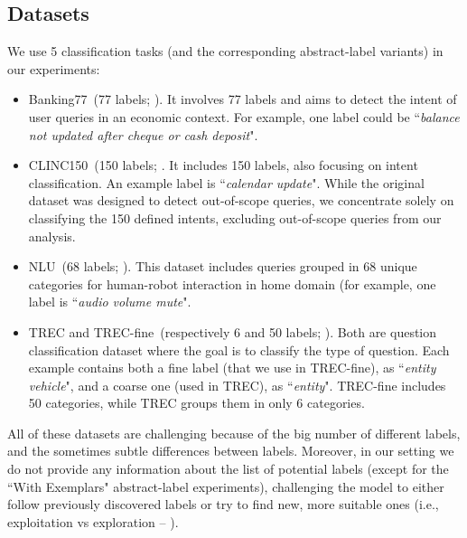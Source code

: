 \documentclass{article}
\theoremstyle{plain}
\theoremstyle{definition}
\theoremstyle{remark}
\newcommand{\banking}{Banking77\xspace}
\newcommand{\clinic}{CLINC150\xspace}
\newcommand{\trec}{TREC\xspace}
\newcommand{\trecfine}{TREC-fine\xspace}
\newcommand{\nlu}{NLU\xspace}
\begin{document}
\subsection{Datasets}\label{sec:appendix:datasets}
We use 5 classification tasks (and the corresponding abstract-label variants) in our experiments:
\begin{itemize}
    \item \banking~(77 labels; \citet{Casanueva2020}). It involves 77 labels and aims to detect the intent of user queries in an economic context. For example, one label could be ``\textit{balance not updated after cheque or cash deposit}".
    \item \clinic~(150 labels; \citet{larson-etal-2019-evaluation}. It includes 150 labels, also focusing on intent classification. An example label is ``\textit{calendar update}". While the original dataset was designed to detect out-of-scope queries, we concentrate solely on classifying the 150 defined intents, excluding out-of-scope queries from our analysis.
    \item \nlu~(68 labels; \citet{Liu2021}). This dataset includes queries grouped in 68 unique categories for human-robot interaction in home domain (for example, one label is ``\textit{audio volume mute}".
    \item \trec and \trecfine~(respectively 6 and 50 labels; \citet{li-roth-2002-learning, hovy-etal-2001-toward}). Both are question classification dataset where the goal is to classify the type of question. Each example contains both a fine label (that we use in \trecfine), as ``\textit{entity vehicle}", and a coarse one (used in \trec), as ``\textit{entity}". \trecfine includes 50 categories, while \trec groups them in only 6 categories.
\end{itemize}
All of these datasets are  challenging because of the big number of different labels, and the sometimes subtle differences between labels. Moreover, in our setting we do not provide any information about the list of potential labels (except for the ``With Exemplars" abstract-label experiments), challenging the model to either follow previously discovered labels or try to find new, more suitable ones (i.e., exploitation vs exploration -- \citet{sutton2018reinforcement}).
\end{document}
